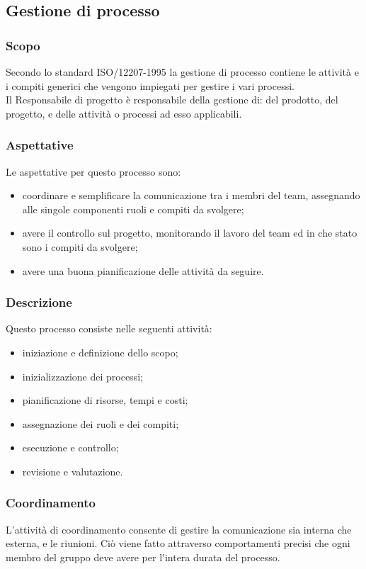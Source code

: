 \subsection{Gestione di processo}
\subsubsection{Scopo}
Secondo lo standard ISO/12207-1995 la gestione di processo contiene le attività e i compiti generici che vengono impiegati per gestire i vari processi.\\
Il Responsabile di progetto è responsabile della gestione di: del prodotto, del progetto, e delle attività o processi ad esso applicabili.
\subsubsection{Aspettative}
Le aspettative per questo processo sono:
\begin{itemize}
    \item coordinare e semplificare la comunicazione tra i membri del team, assegnando alle singole componenti ruoli e compiti da svolgere;
    \item avere il controllo sul progetto, monitorando il lavoro del team ed in che stato sono i compiti da svolgere;
    \item avere una buona pianificazione delle attività da seguire.
\end{itemize}
\subsubsection{Descrizione}
Questo processo consiste nelle seguenti attività:
\begin{itemize}
    \item iniziazione e definizione dello scopo;
    \item inizializzazione dei processi;
    \item pianificazione di risorse, tempi e costi; 
    \item assegnazione dei ruoli e dei compiti;
    \item esecuzione e controllo;
    \item revisione e valutazione.    
\end{itemize}
\subsubsection{Coordinamento}
L'attività di coordinamento consente di gestire la comunicazione sia interna che esterna, e le riunioni. Ciò viene fatto attraverso comportamenti precisi che ogni membro del gruppo deve avere per l'intera durata del processo.
